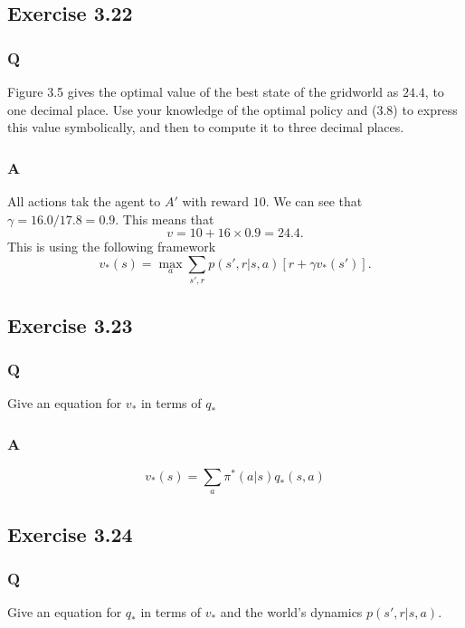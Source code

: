 \subsection{Exercise 3.22}
\subsubsection*{Q}
Figure 3.5 gives the optimal value of the best state of the gridworld as $24.4$, to one decimal place. Use your knowledge of the optimal policy and (3.8) to express this value symbolically, and then to compute it to three decimal places.

\subsubsection*{A}
All actions tak the agent to $A'$ with reward $10$. We can see that $\gamma = 16.0 / 17.8 = 0.9$. This means that
\begin{equation}
    v = 10 + 16 \times 0.9 = 24.4.
\end{equation}
This is using the following framework
\begin{equation}
    v_*(s) = \max_{a}\sum_{s', r} p (s', r| s, a)[r + \gamma v_*(s')].
\end{equation}


\subsection{Exercise 3.23}
\subsubsection*{Q}
Give an equation for $v_*$ in terms of $q_*$

\subsubsection*{A}
\begin{equation}
    v_*(s) = \sum_a \pi^*(a | s) q_*(s, a)
\end{equation}


\subsection{Exercise 3.24}
\subsubsection*{Q}
Give an equation for $q_*$ in terms of $v_*$ and the world's dynamics $p(s', r| s, a)$.

